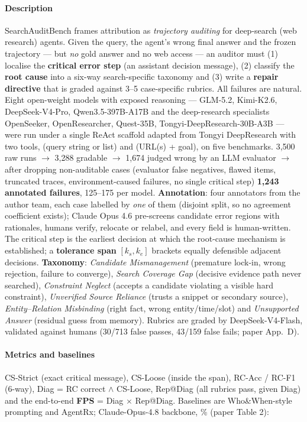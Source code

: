 \paragraph{Description} SearchAuditBench frames attribution as \emph{trajectory auditing} for deep-search (web research) agents. Given the query, the agent's wrong final answer and the frozen trajectory --- but \emph{no} gold answer and no web access --- an auditor must (1) localise the \textbf{critical error step} (an assistant decision message), (2) classify the \textbf{root cause} into a six-way search-specific taxonomy and (3) write a \textbf{repair directive} that is graded against 3--5 case-specific rubrics. All failures are natural. Eight open-weight models with exposed reasoning --- GLM-5.2, Kimi-K2.6, DeepSeek-V4-Pro, Qwen3.5-397B-A17B and the deep-research specialists OpenSeeker, OpenResearcher, Quest-35B, Tongyi-DeepResearch-30B-A3B --- were run under a single ReAct scaffold adapted from Tongyi DeepResearch with two tools,  (query string or list) and  (URL(s) + goal), on five benchmarks. 3,500 raw runs $\to$ 3,288 gradable $\to$ 1,674 judged wrong by an LLM evaluator $\to$ after dropping non-auditable cases (evaluator false negatives, flawed items, truncated traces, environment-caused failures, no single critical step) \textbf{1,243 annotated failures}, 125--175 per model. \textbf{Annotation}: four annotators from the author team, each case labelled by \emph{one} of them (disjoint split, so no agreement coefficient exists); Claude Opus 4.6 pre-screens candidate error regions with rationales, humans verify, relocate or relabel, and every field is human-written. The critical step is the earliest decision at which the root-cause mechanism is established; a \textbf{tolerance span} $[k_s,k_e]$ brackets equally defensible adjacent decisions. \textbf{Taxonomy}: \emph{Candidate Mismanagement} (premature lock-in, wrong rejection, failure to converge), \emph{Search Coverage Gap} (decisive evidence path never searched), \emph{Constraint Neglect} (accepts a candidate violating a visible hard constraint), \emph{Unverified Source Reliance} (trusts a snippet or secondary source), \emph{Entity--Relation Misbinding} (right fact, wrong entity/time/slot) and \emph{Unsupported Answer} (residual guess from memory). Rubrics are graded by DeepSeek-V4-Flash, validated against humans (30/713 false passes, 43/159 false fails; paper App.~D).

\paragraph{Metrics and baselines} CS-Strict (exact critical message), CS-Loose (inside the span), RC-Acc / RC-F1 (6-way), Diag = RC correct $\wedge$ CS-Loose, Rep@Diag (all rubrics pass, given Diag) and the end-to-end \textbf{FPS} = Diag $\times$ Rep@Diag. Baselines are Who\&When-style prompting and AgentRx; Claude-Opus-4.8 backbone, \% (paper Table 2):

